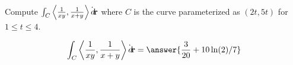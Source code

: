 \documentclass{ximera}
\author{David Guichard \and Neal Koblitz \and H. Jerome Keisler \and Albert Scheller \and Barry Balof \and Mike Wills \and Matthew Carr}
\begin{document}
\begin{exercise}




Compute $\int_C \left\langle \frac{1}{xy},\frac{1}{x+y}\right\rangle\dot{\mathop{}\!d\!}\mathbf{r}$ where $C$ is the curve parameterized as $(2t,5t)$ for $1\le t\le 4$.

\begin{prompt}
\[
\int_C \vector{\frac{1}{xy},\frac{1}{x+y}}\dot\d\vec{r}=\answer{\frac{3}{20}+10\ln(2)/7}
\]
\end{prompt}



\end{exercise}
\end{document}
